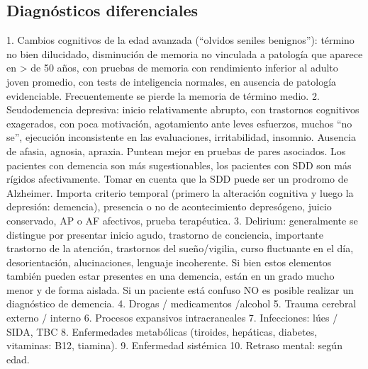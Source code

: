 \subsection*{Diagnósticos diferenciales}
1. Cambios cognitivos de la edad avanzada (“olvidos seniles benignos”): término no bien dilucidado, disminución de memoria no vinculada a patología que aparece en > de 50 años, con pruebas de memoria con rendimiento inferior al adulto joven promedio, con tests de inteligencia normales, en ausencia de patología evidenciable. Frecuentemente se pierde la memoria de término medio.
2. Seudodemencia depresiva: inicio relativamente abrupto, con trastornos cognitivos exagerados, con poca motivación, agotamiento ante leves esfuerzos, muchos “no se”, ejecución inconsistente en las evaluaciones, irritabilidad, insomnio. Ausencia de afasia, agnosia, apraxia. Puntean mejor en pruebas de pares asociados. Los pacientes con demencia son más sugestionables, los pacientes con SDD son más rígidos afectivamente. Tomar en cuenta que la SDD puede ser un prodromo de Alzheimer. Importa criterio temporal (primero la alteración cognitiva y luego la depresión: demencia), presencia o no de acontecimiento depresógeno, juicio conservado, AP o AF afectivos, prueba terapéutica.
3. Delirium: generalmente se distingue por presentar inicio agudo, trastorno de conciencia, importante trastorno de la atención, trastornos del sueño/vigilia, curso fluctuante en el día, desorientación, alucinaciones, lenguaje incoherente. Si bien estos elementos también pueden estar presentes en una demencia, están en un grado mucho menor y de forma aislada. Si un paciente está confuso NO es posible realizar un diagnóstico de demencia.
4. Drogas / medicamentos /alcohol
5. Trauma cerebral externo / interno
6. Procesos expansivos intracraneales
7. Infecciones: lúes / SIDA, TBC
8. Enfermedades metabólicas (tiroides, hepáticas, diabetes, vitaminas: B12, tiamina).
9. Enfermedad sistémica
10. Retraso mental: según edad.
